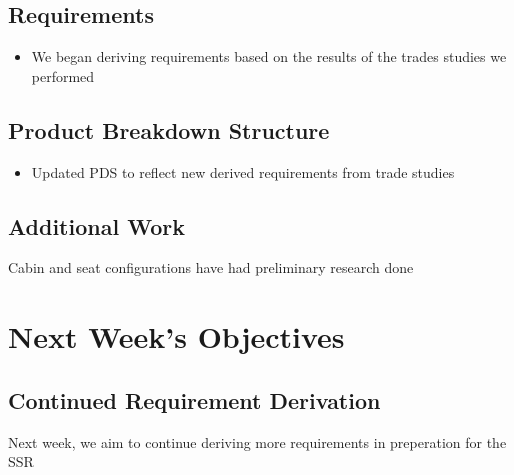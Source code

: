 \documentclass[10pt,twocolumn]{article}  %
\begin{document}
\subsection{Requirements}\label{requirements}

\begin{itemize}
\tightlist
\item
  We began deriving requirements based on the results of the trades
  studies we performed
\end{itemize}

\subsection{Product Breakdown
Structure}\label{product-breakdown-structure}

\begin{itemize}
\tightlist
\item
  Updated PDS to reflect new derived requirements from trade studies
\end{itemize}

\subsection{Additional Work}\label{additional-work}

Cabin and seat configurations have had preliminary research done

\section{Next Week's Objectives}\label{next-weeks-objectives}

\subsection{Continued Requirement
Derivation}\label{continued-requirement-derivation}

Next week, we aim to continue deriving more requirements in preperation
for the SSR
\end{document}
